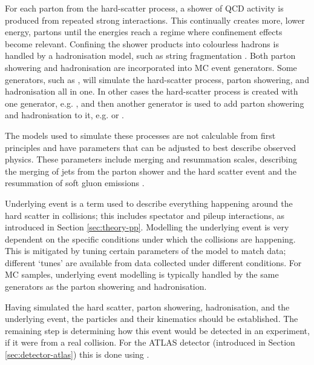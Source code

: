 For each parton from the hard-scatter process, a shower of \ac{QCD} activity is
produced from repeated strong interactions. This continually creates more, lower
energy, partons until the energies reach a regime where confinement effects
become relevant. Confining the shower products into colourless hadrons is
handled by a hadronisation model, such as string fragmentation
\cite{Andersson1983}. Both parton showering and hadronisation are incorporated
into \ac{MC} event generators. Some generators, such as \sherpa, will simulate
the hard-scatter process, parton showering, and hadronisation all in one. In
other cases the hard-scatter process is created with one generator, e.g.
\madgraph, and then another generator is used to add parton showering and
hadronisation to it, e.g. \pythia or \herwig.

The models used to simulate these processes are not calculable from first
principles and have parameters that can be adjusted to best describe observed
physics. These parameters include merging and resummation scales, describing the
merging of jets from the parton shower and the hard scatter event and the
resummation of soft gluon emissions \cite{sherpa2dot2}.

Underlying event is a term used to describe everything happening around the hard
scatter in collisions; this includes spectator and pileup interactions, as
introduced in Section \ref{sec:theory-pp}.
Modelling the underlying event is very dependent on the specific conditions
under which the collisions are happening.  This is mitigated by tuning certain
parameters of the model to match data; different `tunes' are available from data
collected under different conditions.  For \ac{MC} samples, underlying event
modelling is typically handled by the same generators as the parton showering
and hadronisation.

Having simulated the hard scatter, parton showering, hadronisation, and the
underlying event, the particles and their kinematics should be established. The
remaining step is determining how this event would be detected in an experiment,
if it were from a real collision. For the \acs{ATLAS} detector (introduced in
Section \ref{sec:detector-atlas}) this is done using \geantfour \cite{geant4,
ATLASsim1}.

